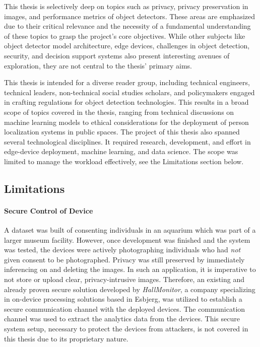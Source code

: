 This thesis is selectively deep on topics such as privacy, privacy preservation in images, and performance metrics of object detectors. These areas are emphasized due to their critical relevance and the necessity of a fundamental understanding of these topics to grasp the project's core objectives. While other subjects like object detector model architecture, edge devices, challenges in object detection, security, and decision support systems also present interesting avenues of exploration, they are not central to the thesis' primary aims.

This thesis is intended for a diverse reader group, including technical engineers, technical leaders, non-technical social studies scholars, and policymakers engaged in crafting regulations for object detection technologies. This results in a broad scope of topics covered in the thesis, ranging from technical discussions on machine learning models to ethical considerations for the deployment of person localization systems in public spaces. The project of this thesis also spanned several technological disciplines. It required research, development, and effort in edge-device deployment, machine learning, and data science. The scope was limited to manage the workload effectively, see the Limitations section below. 

\subsection{Limitations}
\paragraph{Secure Control of Device}
\label{sec:scope_ssh}
A dataset was built of consenting individuals in an aquarium which was part of a larger museum facility. However, once development was finished and the system was tested, the devices were actively photographing individuals who had \textit{not} given consent to be photographed. Privacy was still preserved by immediately inferencing on and deleting the images. In such an application, it is imperative to not store or upload clear, privacy-intrusive images. Therefore, an existing and already proven secure solution developed by \textit{HallMonitor}, a company specializing in on-device processing solutions based in Esbjerg, was utilized to establish a secure communication channel with the deployed devices. The communication channel was used to extract the analytics data from the devices. This secure system setup, necessary to protect the devices from attackers, is not covered in this thesis due to its proprietary nature.

